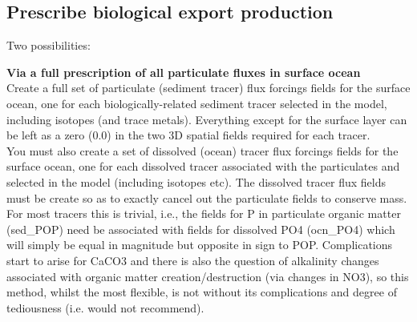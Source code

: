 \documentclass[10pt,twoside]{article}
\begin{document}

\subsection{Prescribe biological export production}\label{Prescribe biological export production}

Two possibilities:

\begin{compactenum}

        \item \textbf{Via a full prescription of all particulate fluxes in surface ocean}
                \\Create a full set of particulate (sediment tracer) flux forcings fields for the surface ocean, one for each biologically-related sediment tracer selected in the model, including isotopes (and trace metals). Everything except for the surface layer can be left as a zero (0.0) in the two 3D spatial fields required for each tracer.
        \\You must also create a set of dissolved (ocean) tracer flux forcings fields for the surface ocean, one for each dissolved tracer associated with the particulates and selected in the model (including isotopes etc). The dissolved tracer flux fields must be create so as to exactly cancel out the particulate fields to conserve mass. For most tracers this is trivial, i.e., the fields for P in particulate organic matter (sed\_POP) need be associated with fields for dissolved PO4 (ocn\_PO4) which will simply be equal in magnitude but opposite in sign to POP. Complications start to arise for CaCO3 and there is also the question of alkalinity changes associated with organic matter creation/destruction (via changes in NO3), so this method, whilst the most flexible, is not without its complications and degree of tediousness (i.e. would not recommend).
        

\end{compactenum}
\end{document}
